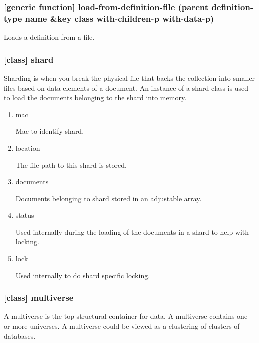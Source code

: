 \documentclass[11pt]{article}
\begin{document}
\subsubsection{[generic function] load-from-definition-file (parent definition-type name \&key class with-children-p with-data-p)}
\label{sec:orgbce9177}

Loads a definition from a file.

\subsubsection{[class] shard}
\label{sec:org80d621f}

Sharding is when you break the physical file that backs the collection
into smaller files based on data elements of a document. An instance
of a shard class is used to load the documents belonging to the shard
into memory.

\begin{enumerate}
\item\relax [accessor] mac
\label{sec:org40a254d}

Mac to identify shard.

\item\relax [accessor] location
\label{sec:orga4edaa9}

The file path to this shard is stored.

\item\relax [accessor] documents
\label{sec:org39dd39e}

Documents belonging to shard stored in an adjustable array.

\item\relax [accessor] status
\label{sec:org52332c0}

Used internally during the loading of the documents in a shard to help with locking.

\item\relax [accessor] lock
\label{sec:org3a14d25}

Used internally to do shard specific locking.
\end{enumerate}

\subsubsection{[class] multiverse}
\label{sec:orgcf2f949}

A multiverse is the top structural container for data. A multiverse
contains one or more universes. A multiverse could be viewed as a clustering of clusters of
databases.
\end{document}
